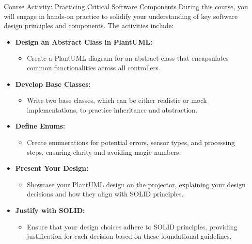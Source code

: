 \documentclass[10pt]{beamer}
\begin{document}
\begin{frame}{Course Activity: Practicing Critical Software Components}
  During this course, you will engage in hands-on practice to solidify your understanding of key software design principles and components. The activities include:
  \begin{itemize}
      \item \textbf{Design an Abstract Class in PlantUML:}
      \begin{itemize}
          \item Create a PlantUML diagram for an abstract class that encapsulates common functionalities across all controllers.
      \end{itemize}

      \item \textbf{Develop Base Classes:}
      \begin{itemize}
          \item Write two base classes, which can be either realistic or mock implementations, to practice inheritance and abstraction.
      \end{itemize}

      \item \textbf{Define Enums:}
      \begin{itemize}
          \item Create enumerations for potential errors, sensor types, and processing steps, ensuring clarity and avoiding magic numbers.
      \end{itemize}

      \item \textbf{Present Your Design:}
      \begin{itemize}
          \item Showcase your PlantUML design on the projector, explaining your design decisions and how they align with SOLID principles.
      \end{itemize}

      \item \textbf{Justify with SOLID:}
      \begin{itemize}
          \item Ensure that your design choices adhere to SOLID principles, providing justification for each decision based on these foundational guidelines.
      \end{itemize}
  \end{itemize}
\end{frame}
\end{document}
